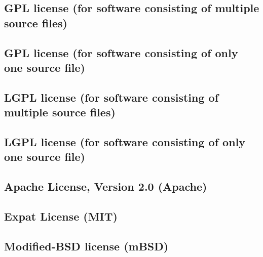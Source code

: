 \documentclass[10pt,a4paper]{article}
\begin{document}
\subsection{GPL license (for software consisting of multiple source files)}
\begin{boilerplate}

\end{boilerplate}

\subsection{GPL license (for software consisting of only one source file)}
\begin{boilerplate}

\end{boilerplate}

\subsection{LGPL license (for software consisting of multiple source files)}
\begin{boilerplate}

\end{boilerplate}

\subsection{LGPL license (for software consisting of only one source file)}
\begin{boilerplate}

\end{boilerplate}

\subsection{Apache License, Version 2.0 (Apache)}
\begin{boilerplate}

\end{boilerplate}

\subsection{Expat License (MIT)}
\begin{boilerplate}

\end{boilerplate}

\subsection{Modified-BSD license (mBSD)}
\begin{boilerplate}

\end{boilerplate}
\end{document}

